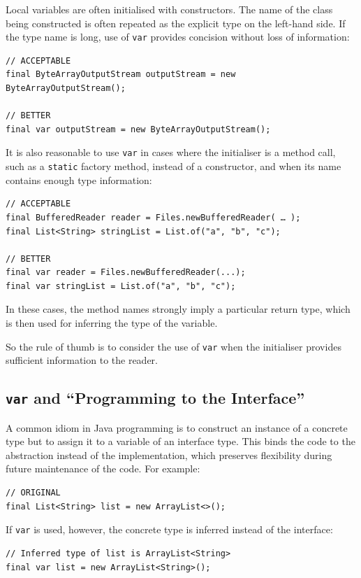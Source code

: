 \documentclass[11pt,a4paper, titlepage, parskip=half, headsepline, footsepline, cleardoublepage=current, headheight=1cm]{scrbook}
\begin{document}
Local variables are often initialised with constructors. The name of the class being constructed is often repeated as the explicit type on the left-hand side. If the type name is long, use of \lstinline|var| provides concision without loss of information:
\begin{lstlisting}
// ACCEPTABLE
final ByteArrayOutputStream outputStream = new ByteArrayOutputStream();

// BETTER
final var outputStream = new ByteArrayOutputStream();
\end{lstlisting}

It is also reasonable to use \lstinline|var| in cases where the initialiser is a method call, such as a \lstinline|static| factory method, instead of a constructor, and when its name contains enough type information:
\begin{lstlisting}
// ACCEPTABLE
final BufferedReader reader = Files.newBufferedReader( … );
final List<String> stringList = List.of("a", "b", "c");

// BETTER
final var reader = Files.newBufferedReader(...);
final var stringList = List.of("a", "b", "c");
\end{lstlisting}

In these cases, the method names strongly imply a particular return type, which is then used for inferring the type of the variable.

So the rule of thumb is to consider the use of \lstinline|var| when the initialiser provides sufficient information to the reader.


\subsection{\lstinline|var| and “Programming to the Interface”}
A common idiom in Java programming is to construct an instance of a concrete type but to assign it to a variable of an interface type. This binds the code to the abstraction instead of the implementation, which preserves flexibility during future maintenance of the code. For example:
\begin{lstlisting}
// ORIGINAL
final List<String> list = new ArrayList<>();
\end{lstlisting}
If \lstinline|var| is used, however, the concrete type is inferred instead of the interface:
\begin{lstlisting}
// Inferred type of list is ArrayList<String>
final var list = new ArrayList<String>();
\end{lstlisting}
\end{document}
